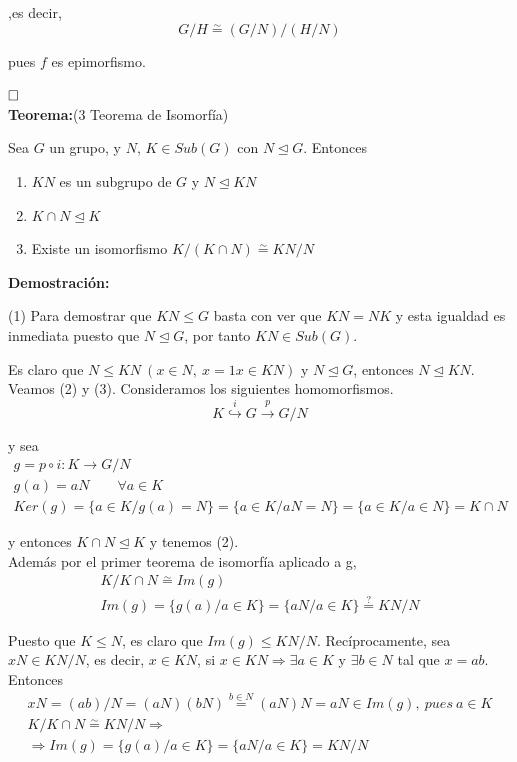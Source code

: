 \documentclass{article}
\begin{document}
,es decir,
\begin{equation*}
G/H\overset{\sim}{=} (G/N)/(H/N)
\end{equation*}

pues $f$ es epimorfismo.

$\hfill\square$ \\

\textbf{Teorema:}(3 Teorema de Isomorfía)

Sea $G$ un grupo, y $N,\,K\in Sub(G)$ con $N\unlhd G$. Entonces
\begin{enumerate}[(1)]
\item $KN$ es un subgrupo de $G$ y $N\unlhd KN$

\item $K\cap N\unlhd K$ 

\item Existe un isomorfismo $K/(K\cap N)\overset{\sim}{=} KN/N$
\end{enumerate}

\textbf{Demostración:}

(1) Para demostrar que $KN\leq G$ basta con ver que $KN=NK$ y esta igualdad es inmediata puesto que $N\unlhd G$, por tanto $KN\in Sub(G)$.

Es claro que $N\leq KN\: (x\in N,\: x=1x\in KN)$ y $N\unlhd G$, entonces $N\unlhd KN$. \\

Veamos (2) y (3). Consideramos los siguientes homomorfismos.
\begin{equation*}
K\overset{i}{\hookrightarrow} G \overset{p}{\rightarrow} G/N
\end{equation*}

y sea
\begin{gather*}
g=p\circ i:K\longrightarrow G/N\\
g(a)=aN\qquad \forall a\in K \\
Ker(g)=\{a\in K/g(a)=N\}=\{a\in K/aN=N\}=\{a\in K/a\in N\}=K\cap N
\end{gather*}

y entonces $K\cap N\unlhd K$ y tenemos (2). \\

Además por el primer teorema de isomorfía aplicado a g,
\begin{gather*}
K/K\cap N\overset{\sim}{=} Im(g) \\
Im(g)=\{g(a)/a\in K\}=\{aN/a\in K\}\overset{?}{=}KN/N
\end{gather*}

Puesto que $K\leq N$, es claro que $Im(g)\leq KN/N$. Recíprocamente, sea $xN\in KN/N$, es decir, $x\in KN$, si $x\in KN\Rightarrow \exists a\in K$ y $\exists b\in N$ tal que $x=ab$. Entonces 
\begin{gather*}
xN=(ab)/N=(aN)(bN)\overset{b\in N}{=}(aN)N=aN\in Im(g),\:pues\:a\in K \\
K/K\cap N\overset{\sim}{=} KN/N \Rightarrow\\
\Rightarrow Im(g)=\{g(a)/a\in K\}=\{aN/a\in K\}=KN/N
\end{gather*}
\end{document}
